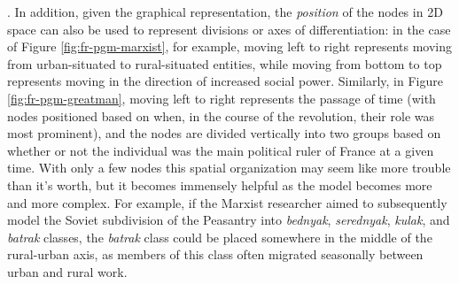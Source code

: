 \documentclass[11pt]{article}
\begin{document}
{	%
}. In addition, given the graphical representation, the \textit{position} of the nodes in 2D space can also be used to represent divisions or axes of differentiation: in the case of Figure \ref{fig:fr-pgm-marxist}, for example, moving left to right represents moving from urban-situated to rural-situated entities, while moving from bottom to top represents moving in the direction of increased social power. Similarly, in Figure \ref{fig:fr-pgm-greatman}, moving left to right represents the passage of time (with nodes positioned based on when, in the course of the revolution, their role was most prominent), and the nodes are divided vertically into two groups based on whether or not the individual was the main political ruler of France at a given time. With only a few nodes this spatial organization may seem like more trouble than it's worth, but it becomes immensely helpful as the model becomes more and more complex. For example, if the Marxist researcher aimed to subsequently model the Soviet subdivision of the Peasantry into \textit{bednyak}, \textit{serednyak}, \textit{kulak}, and \textit{batrak} classes, the \textit{batrak} class could be placed somewhere in the middle of the rural-urban axis, as members of this class often migrated seasonally between urban and rural work.
\end{document}
